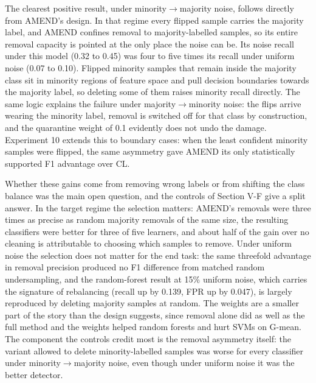\documentclass[conference]{IEEEtran}
\begin{document}
The clearest positive result, under minority$\rightarrow $majority noise, follows directly from AMEND's design. In that regime every flipped sample carries the majority label, and AMEND confines removal to majority-labelled samples, so its entire removal capacity is pointed at the only place the noise can be. Its noise recall under this model (0.32 to 0.45) was four to five times its recall under uniform noise (0.07 to 0.10). Flipped minority samples that remain inside the majority class sit in minority regions of feature space and pull decision boundaries towards the majority label, so deleting some of them raises minority recall directly. The same logic explains the failure under majority$\rightarrow $minority noise: the flips arrive wearing the minority label, removal is switched off for that class by construction, and the quarantine weight of 0.1 evidently does not undo the damage. Experiment 10 extends this to boundary cases: when the least confident minority samples were flipped, the same asymmetry gave AMEND its only statistically supported F1 advantage over CL.

Whether these gains come from removing wrong labels or from shifting the class balance was the main open question, and the controls of Section V-F give a split answer. In the target regime the selection matters: AMEND's removals were three times as precise as random majority removals of the same size, the resulting classifiers were better for three of five learners, and about half of the gain over no cleaning is attributable to choosing which samples to remove. Under uniform noise the selection does not matter for the end task: the same threefold advantage in removal precision produced no F1 difference from matched random undersampling, and the random-forest result at 15\% uniform noise, which carries the signature of rebalancing (recall up by 0.139, FPR up by 0.047), is largely reproduced by deleting majority samples at random. The weights are a smaller part of the story than the design suggests, since removal alone did as well as the full method and the weights helped random forests and hurt SVMs on G-mean. The component the controls credit most is the removal asymmetry itself: the variant allowed to delete minority-labelled samples was worse for every classifier under minority$\rightarrow $majority noise, even though under uniform noise it was the better detector.
\end{document}
